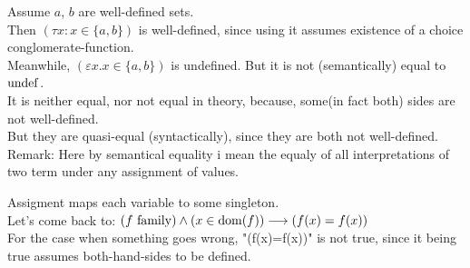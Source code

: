 



Assume $a$, $b$ are well-defined sets.\\
Then $
(\tau x: x \in \{a,b\}) 
$ is well-defined, since using it assumes existence of a choice conglomerate-function.\\
Meanwhile,
$
(\varepsilon x. x \in \{a,b\}) 
$
 is undefined. But it is not (semantically) equal to $\mathrm{undef}$.\\
It is neither equal, nor not equal in theory, because, some(in fact both) sides are not well-defined.\\
But they are quasi-equal (syntactically), since they are both not well-defined.\\
 
Remark: 
Here by semantical equality i mean the equaly of all interpretations of two term under any assignment of values.

Assigment maps each variable to some singleton.\\
Let's come back to:
$(f\mathrm{\ family})\land(x\in\mathrm{dom}(f)) \longrightarrow (f(x)=f(x))$\\
For the case when something goes wrong, "(f(x)=f(x))" is not true, since it being true assumes both-hand-sides to be defined.


